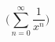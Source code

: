 \documentclass{tarticle}
\begin{document}
\begin{equation}
\Bigg( \sum_{n=0}^{\infty} \frac{1}{x^n} \Bigg)
\end{equation}
\end{document}
